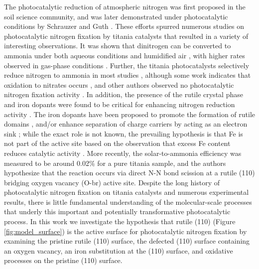 \documentclass[journal=ascecg,manuscript=article,articletitle=true]{achemso}
\begin{document}
The photocatalytic reduction of atmospheric nitrogen was first proposed in the soil science community\cite{Dhar_1941}, and was later demonstrated under photocatalytic conditions by Schrauzer and Guth \cite{Schrauzer_1977,Schrauzer_1983}. These efforts spurred numerous studies on photocatalytic nitrogen fixation by titania catalysts \cite{Bickley_1979,Augugliaro_1982,Soria_1991,Schrauzer_2011, Yuan_2013,Hirakawa_2017, Medford_2017} that resulted in a variety of interesting observations. It was shown that dinitrogen can be converted to ammonia under both aqueous conditions \cite{Augugliaro_1982,Hirakawa_2017} and humidified air \cite{Schrauzer_1977,Schrauzer_1983}, with higher rates observed in gas-phase conditions \cite{Schrauzer_2011}. Further, the titania photocatalysts selectively reduce nitrogen to ammonia in most studies \cite{Schrauzer_1977,Schrauzer_1983,Augugliaro_1982,Soria_1991,Schrauzer_2011,Hirakawa_2017}, although some work indicates that oxidation to nitrates occurs \cite{Bickley_1979,Yuan_2013}, and other authors observed no photocatalytic nitrogen fixation activity \cite{edwards1992opinion,davies1993reply,Boucher_1995,Davies1995}. In addition, the presence of the rutile crystal phase and iron dopants were found to be critical for enhancing nitrogen reduction activity \cite{Schrauzer_1977,Schrauzer_1983,Augugliaro_1982,Soria_1991}. The iron dopants have been proposed to promote the formation of rutile domains \cite{Schrauzer_1977}, and/or enhance separation of charge carriers by acting as an electron sink \cite{Soria_1991}; while the exact role is not known, the prevailing hypothesis is that Fe is not part of the active site based on the observation that excess Fe content reduces catalytic activity \cite{Soria_1991}. More recently, the solar-to-ammonia efficiency was measured to be around 0.02\% for a pure titania sample, and the authors hypothesize that the reaction occurs via direct N-N bond scission at a rutile (110) bridging oxygen vacancy (O-br) active site.\cite{Hirakawa_2017} Despite the long history of photocatalytic nitrogen fixation on titania catalysts and numerous experimental results, there is little fundamental understanding of the molecular-scale processes that underly this important and potentially transformative photocatalytic process. In this work we investigate the hypothesis that rutile (110) (Figure \ref{fig:model_surface}) is the active surface for photocatalytic nitrogen fixation by examining the pristine rutile (110) surface, the defected (110) surface containing an oxygen vacancy, an iron substitution at the (110) surface, and oxidative processes on the pristine (110) surface.
\end{document}
